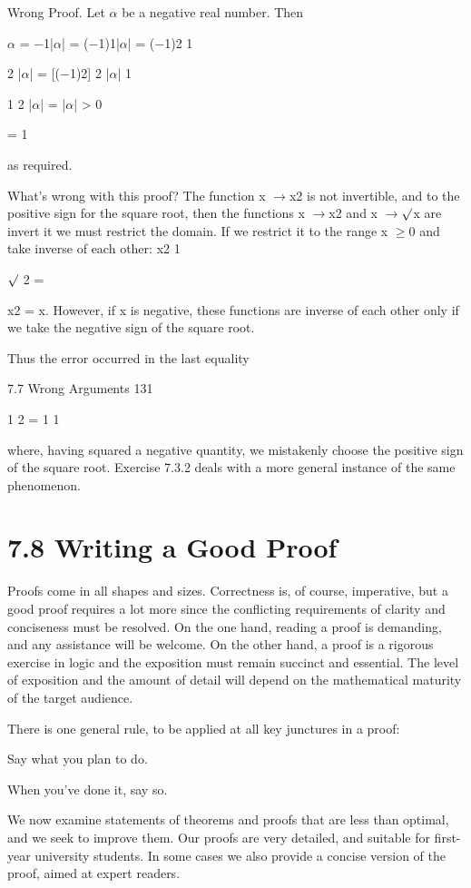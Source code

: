 \documentclass[11pt]{article}
\theoremstyle{plain}
\theoremstyle{definition}
\begin{document}
Wrong Proof. Let $\alpha$ be a negative real number. Then

$\alpha$ = $-$1|$\alpha$| = ($-$1)1|$\alpha$| = ($-$1)2\textperiodcentered{} 1

2 |$\alpha$| = [($-$1)2] 2 |$\alpha$| 1

1 2 |$\alpha$| = |$\alpha$| > 0

= 1

as required. 

What's wrong with this proof? The function x $\to$x2 is not invertible, and to the positive sign for the square root, then the functions x $\to$x2 and x $\to$$\surd$x are invert it we must restrict the domain. If we restrict it to the range x $\geq$0 and take inverse of each other: x2\textperiodcentered{} 1

$\surd$ 2 =

x2 = x. However, if x is negative, these functions are inverse of each other only if we take the negative sign of the square root.

Thus the error occurred in the last equality

7.7 Wrong Arguments 131

1 2 = 1 1

where, having squared a negative quantity, we mistakenly choose the positive sign of the square root. Exercise 7.3.2 deals with a more general instance of the same phenomenon.

\section{7.8 Writing a Good Proof}

Proofs come in all shapes and sizes. Correctness is, of course, imperative, but a good proof requires a lot more since the conflicting requirements of clarity and conciseness must be resolved. On the one hand, reading a proof is demanding, and any assistance will be welcome. On the other hand, a proof is a rigorous exercise in logic and the exposition must remain succinct and essential. The level of exposition and the amount of detail will depend on the mathematical maturity of the target audience.

There is one general rule, to be applied at all key junctures in a proof:

\textbullet{} Say what you plan to do.

\textbullet{} When you've done it, say so.

We now examine statements of theorems and proofs that are less than optimal, and we seek to improve them. Our proofs are very detailed, and suitable for first-year university students. In some cases we also provide a concise version of the proof, aimed at expert readers.
\end{document}
